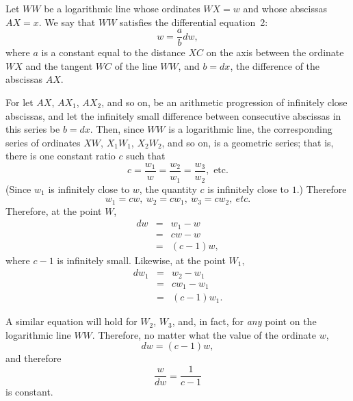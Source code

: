 \documentclass[twoside,openright]{article}
\begin{document}
 Let $WW$ be a logarithmic
line whose ordinates $WX = w$ and whose abscissas $AX = x$.  We say
that $WW$ satisfies the differential equation~2:
$$w = \frac{a}{b}dw,$$
where $a$ is a constant equal to the distance $XC$ on the axis between
the ordinate $WX$ and the tangent $WC$ of the line $WW$, and $b=dx$,
the difference of the abscissas $AX$.

For let $AX$, $AX_1$, $AX_2$, and so on, be an arithmetic progression
of infinitely close abscissas, and let the infinitely small difference
between consecutive abscissas in this series be $b =dx$.  Then, since
$WW$ is a logarithmic line, the corresponding series of ordinates
$XW$, $X_1W_1$, $X_2W_2$, and so on, is a geometric series; that is,
there is one constant ratio $c$ such that
$$ c= \frac{w_1}{w} = \frac{w_2}{w_1} = \frac{w_3}{w_2}, \mbox{ etc.}$$
(Since $w_1$ is infinitely close to $w$, the quantity $c$ is infinitely close to $1$.)
Therefore
$$ w_1 = cw,\ w_2 = cw_1,\ w_3 = cw_2,\ etc.$$
Therefore, at the point $W$,
\begin{eqnarray*}
dw & = & w_1 - w\\
& = & cw -w\\
& = & (c-1)w,
\end{eqnarray*}
where $c-1$ is infinitely small.
 Likewise, at the point $W_1$,
 \begin{eqnarray*}
dw_1 & = & w_2 - w_1\\
& = & cw_1 -w_1\\
& = & (c-1)w_1.
\end{eqnarray*}

\hspace{-1em} A similar equation will hold for $W_2$, $W_3$, and, in
fact, for {\em any} point on the logarithmic line $WW$.  Therefore, no
matter what the value of the ordinate $w$,
$$dw = (c-1)w,$$
and therefore
$$\frac{w}{dw} = \frac{1}{c-1}$$
is constant.  
\end{document}
